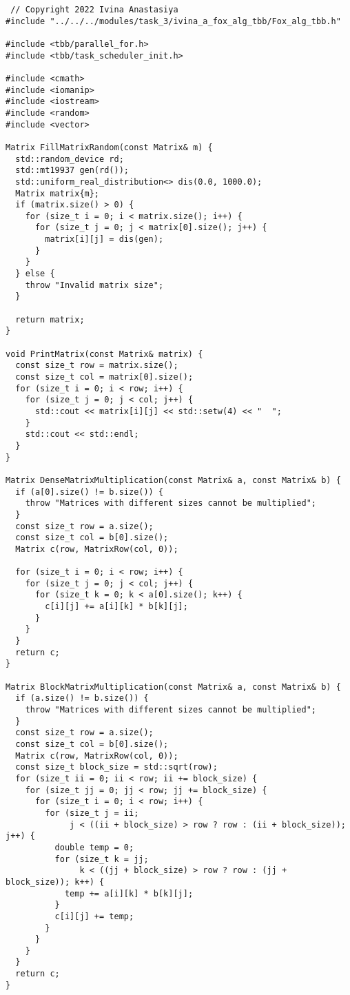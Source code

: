 \documentclass{report}
\begin{document}
 \begin{lstlisting}
 // Copyright 2022 Ivina Anastasiya
#include "../../../modules/task_3/ivina_a_fox_alg_tbb/Fox_alg_tbb.h"

#include <tbb/parallel_for.h>
#include <tbb/task_scheduler_init.h>

#include <cmath>
#include <iomanip>
#include <iostream>
#include <random>
#include <vector>

Matrix FillMatrixRandom(const Matrix& m) {
  std::random_device rd;
  std::mt19937 gen(rd());
  std::uniform_real_distribution<> dis(0.0, 1000.0);
  Matrix matrix{m};
  if (matrix.size() > 0) {
    for (size_t i = 0; i < matrix.size(); i++) {
      for (size_t j = 0; j < matrix[0].size(); j++) {
        matrix[i][j] = dis(gen);
      }
    }
  } else {
    throw "Invalid matrix size";
  }

  return matrix;
}

void PrintMatrix(const Matrix& matrix) {
  const size_t row = matrix.size();
  const size_t col = matrix[0].size();
  for (size_t i = 0; i < row; i++) {
    for (size_t j = 0; j < col; j++) {
      std::cout << matrix[i][j] << std::setw(4) << "  ";
    }
    std::cout << std::endl;
  }
}

Matrix DenseMatrixMultiplication(const Matrix& a, const Matrix& b) {
  if (a[0].size() != b.size()) {
    throw "Matrices with different sizes cannot be multiplied";
  }
  const size_t row = a.size();
  const size_t col = b[0].size();
  Matrix c(row, MatrixRow(col, 0));

  for (size_t i = 0; i < row; i++) {
    for (size_t j = 0; j < col; j++) {
      for (size_t k = 0; k < a[0].size(); k++) {
        c[i][j] += a[i][k] * b[k][j];
      }
    }
  }
  return c;
}

Matrix BlockMatrixMultiplication(const Matrix& a, const Matrix& b) {
  if (a.size() != b.size()) {
    throw "Matrices with different sizes cannot be multiplied";
  }
  const size_t row = a.size();
  const size_t col = b[0].size();
  Matrix c(row, MatrixRow(col, 0));
  const size_t block_size = std::sqrt(row);
  for (size_t ii = 0; ii < row; ii += block_size) {
    for (size_t jj = 0; jj < row; jj += block_size) {
      for (size_t i = 0; i < row; i++) {
        for (size_t j = ii;
             j < ((ii + block_size) > row ? row : (ii + block_size)); j++) {
          double temp = 0;
          for (size_t k = jj;
               k < ((jj + block_size) > row ? row : (jj + block_size)); k++) {
            temp += a[i][k] * b[k][j];
          }
          c[i][j] += temp;
        }
      }
    }
  }
  return c;
}


\end{lstlisting}
\end{document}
